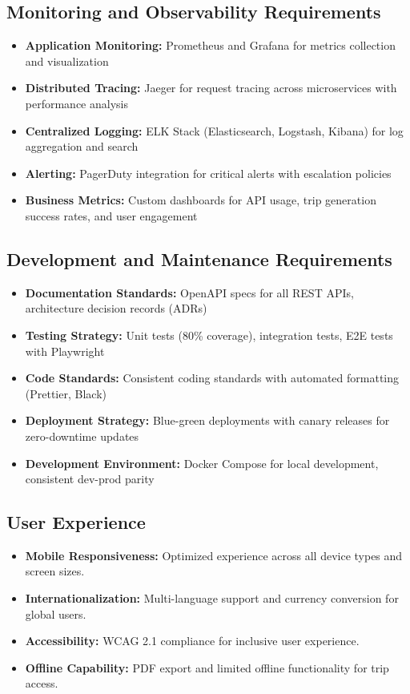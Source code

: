 \subsection{Monitoring and Observability Requirements}
\begin{itemize}
    \item \textbf{Application Monitoring:} Prometheus and Grafana for metrics collection and visualization
    \item \textbf{Distributed Tracing:} Jaeger for request tracing across microservices with performance analysis
    \item \textbf{Centralized Logging:} ELK Stack (Elasticsearch, Logstash, Kibana) for log aggregation and search
    \item \textbf{Alerting:} PagerDuty integration for critical alerts with escalation policies
    \item \textbf{Business Metrics:} Custom dashboards for API usage, trip generation success rates, and user engagement
\end{itemize}

\subsection{Development and Maintenance Requirements}
\begin{itemize}
    \item \textbf{Documentation Standards:} OpenAPI specs for all REST APIs, architecture decision records (ADRs)
    \item \textbf{Testing Strategy:} Unit tests (80\% coverage), integration tests, E2E tests with Playwright
    \item \textbf{Code Standards:} Consistent coding standards with automated formatting (Prettier, Black)
    \item \textbf{Deployment Strategy:} Blue-green deployments with canary releases for zero-downtime updates
    \item \textbf{Development Environment:} Docker Compose for local development, consistent dev-prod parity
\end{itemize}

\subsection{User Experience}
\begin{itemize}
    \item \textbf{Mobile Responsiveness:} Optimized experience across all device types and screen sizes.
    \item \textbf{Internationalization:} Multi-language support and currency conversion for global users.
    \item \textbf{Accessibility:} WCAG 2.1 compliance for inclusive user experience.
    \item \textbf{Offline Capability:} PDF export and limited offline functionality for trip access.
\end{itemize}

